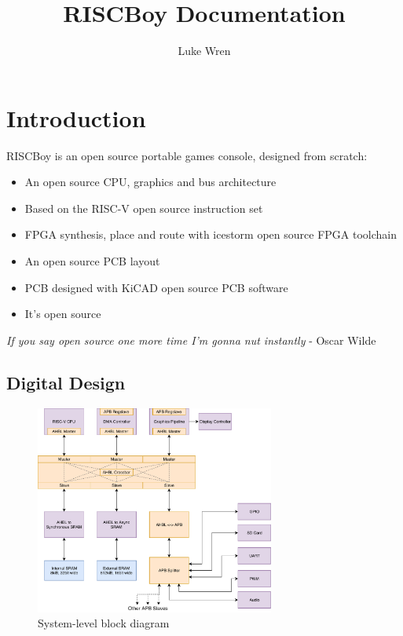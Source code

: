 \documentclass[notitlepage]{article}
\title{RISCBoy Documentation}
\author{Luke Wren}
\makeatletter
\newcommand*{\toccontents}{\@starttoc{toc}}
\makeatother
\begin{document}
\maketitle
\toccontents
\listoffigures
\newpage
{}

\section{Introduction}

RISCBoy is an open source portable games console, designed from scratch:

\begin{itemize}
\item An open source CPU, graphics and bus architecture
\item Based on the RISC-V open source instruction set
\item FPGA synthesis, place and route with icestorm open source FPGA toolchain
\item An open source PCB layout
\item PCB designed with KiCAD open source PCB software
\item It's open source
\end{itemize}

\begin{displayquote}
\textit{If you say open source one more time I'm gonna nut instantly} - Oscar Wilde
\end{displayquote}

\subsection{Digital Design}

\begin{figure}[!htb]
\caption{System-level block diagram}
\label{diagram:system_arch}
\centering
\includegraphics[width=0.7\textwidth]{diagrams/system_arch.pdf}
\end{figure}
\end{document}
